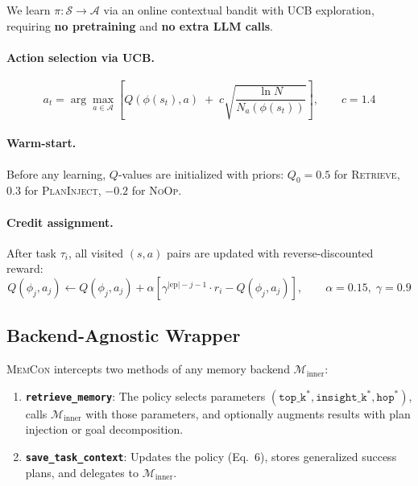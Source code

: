 \documentclass{article} %
\theoremstyle{plain}
\theoremstyle{definition}
\theoremstyle{remark}
\newcommand{\ours}{\textsc{MemCon}\xspace}
\begin{document}
We learn $\pi: \mathcal{S} \to \mathcal{A}$ via an online contextual bandit with UCB exploration, requiring \textbf{no pretraining} and \textbf{no extra LLM calls}.

\paragraph{Action selection via UCB.}
\begin{equation}
    a_t = \arg\max_{a \in \mathcal{A}} \left[ Q(\phi(s_t), a) \;+\; c \sqrt{\frac{\ln N}{N_a(\phi(s_t))}} \right], \qquad c = 1.4
\end{equation}

\paragraph{Warm-start.} Before any learning, $Q$-values are initialized with priors: $Q_0 = 0.5$ for \textsc{Retrieve}, $0.3$ for \textsc{PlanInject}, $-0.2$ for \textsc{NoOp}.

\paragraph{Credit assignment.} After task $\tau_i$, all visited $(s,a)$ pairs are updated with reverse-discounted reward:
\begin{equation}
    Q(\phi_j, a_j) \leftarrow Q(\phi_j, a_j) + \alpha \left[ \gamma^{|\text{ep}| - j - 1} \cdot r_i - Q(\phi_j, a_j) \right], \qquad \alpha\!=\!0.15,\; \gamma\!=\!0.9
\end{equation}


\subsection{Backend-Agnostic Wrapper}
\label{sec:wrapper}

\ours intercepts two methods of any memory backend $\mathcal{M}_{\text{inner}}$:

\begin{enumerate}[leftmargin=1.5em]
    \item \textbf{\texttt{retrieve\_memory}}: The policy selects parameters $(\texttt{top\_k}^*, \texttt{insight\_k}^*, \texttt{hop}^*)$, calls $\mathcal{M}_{\text{inner}}$ with those parameters, and optionally augments results with plan injection or goal decomposition.
    \item \textbf{\texttt{save\_task\_context}}: Updates the policy (Eq.~6), stores generalized success plans, and delegates to $\mathcal{M}_{\text{inner}}$.
\end{enumerate}
\end{document}
